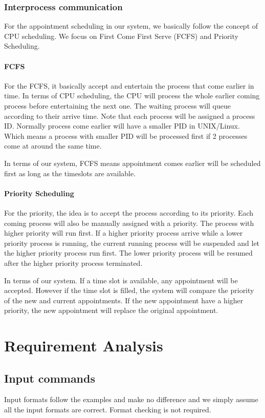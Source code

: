 \documentclass[12pt,a4paper]{report}
\begin{document}
\subsection{Interprocess communication}
For the appointment scheduling in our system, we basically follow the concept of CPU scheduling. We focus on First Come First Serve (FCFS) and Priority Scheduling.
\subsubsection{FCFS}
For the FCFS, it basically accept and entertain the process that come earlier in time. In terms of CPU scheduling, the CPU will process the whole earlier coming process before entertaining the next one. The waiting process will queue according to their arrive time. Note that each process will be assigned a process ID. Normally process come earlier will have a smaller PID in UNIX/Linux. Which means a process with smaller PID will be processed first if 2 processes come at around the same time.

In terms of our system, FCFS means appointment comes earlier will be scheduled first as long as the timeslots are available.
\subsubsection{Priority Scheduling}
For the priority, the idea is to accept the process according to its priority. Each coming process will also be manually assigned with a priority. The process with higher priority will run first. If a higher priority process arrive while a lower priority process is running, the current running process will be suspended and let the higher priority process run first. The lower priority process will be resumed after the higher priority process terminated.

In terms of our system. If a time slot is available, any appointment will be accepted. However if the time slot is filled, the system will compare the priority of the new and current appointments. If the new appointment have a higher priority, the new appointment will replace the original appointment.
\chapter{Requirement Analysis}
\section{Input commands}
Input formats follow the examples and make no difference and we simply assume all the input formats are correct.
Format checking is not required. 
\end{document}
